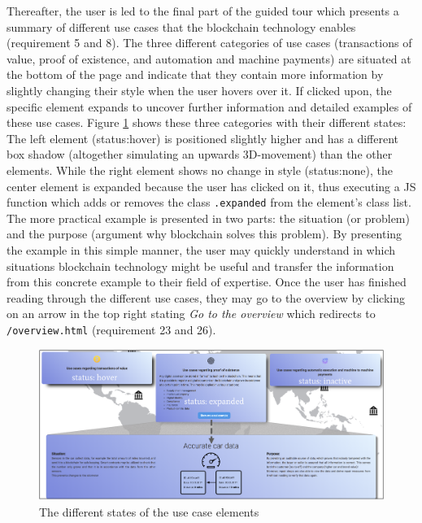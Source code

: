 Thereafter, the user is led to the final part of the guided tour which presents a summary of different use cases that the blockchain technology enables (requirement 5 and 8). The three different categories of use cases (transactions of value, proof of existence, and automation and machine payments) are situated at the bottom of the page and indicate that they contain more information by slightly changing their style when the user hovers over it. If clicked upon, the specific element expands to uncover further information and detailed examples of these use cases. Figure \ref{fig:AnimUC} shows these three categories with their different states: The left element (status:hover) is positioned slightly higher and has a different box shadow (altogether simulating an upwards 3D-movement) than the other elements. While the right element shows no change in style (status:none), the center element is expanded because the user has clicked on it, thus executing a \ac{JS} function which adds or removes the class \texttt{.expanded} from the element's class list. The more practical example is presented in two parts: the situation (or problem) and the purpose (argument why blockchain solves this problem). By presenting the example in this simple manner, the user may quickly understand in which situations blockchain technology might be useful and transfer the information from this concrete example to their field of expertise. Once the user has finished reading through the different use cases, they may go to the overview by clicking on an arrow in the top right stating \textit{Go to the overview} which redirects to \texttt{/overview.html} (requirement 23 and 26). 

\begin{figure}
    \centering
    \includegraphics[width=\linewidth]{graphics/AnimationUseCases.png}
    \caption{The different states of the use case elements}
    \label{fig:AnimUC}
\end{figure}


